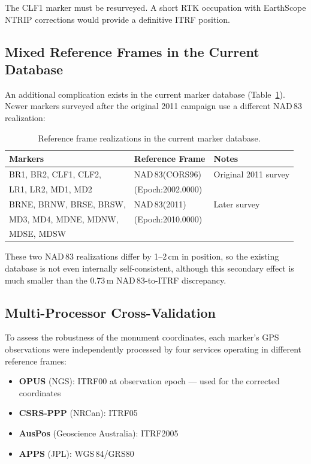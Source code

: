 \documentclass[11pt,letterpaper]{article}
\begin{document}
\noindent The CLF1 marker must be resurveyed. A short RTK occupation with EarthScope NTRIP corrections would provide a definitive ITRF position.

\subsection{Mixed Reference Frames in the Current Database}

An additional complication exists in the current marker database (Table~\ref{tab:mixed_frames}). Newer markers surveyed after the original 2011 campaign use a different NAD\,83 realization:

\begin{table}[H]
\centering
\caption{Reference frame realizations in the current marker database.}
\label{tab:mixed_frames}
\smallskip
\begin{tabular}{@{}lll@{}}
\toprule
{Markers} & {Reference Frame} & {Notes} \\
\midrule
BR1, BR2, CLF1, CLF2, & NAD\,83(CORS96) & Original 2011 survey \\
LR1, LR2, MD1, MD2    & (Epoch:2002.0000) & \\
\addlinespace
BRNE, BRNW, BRSE, BRSW, & NAD\,83(2011) & Later survey \\
MD3, MD4, MDNE, MDNW,   & (Epoch:2010.0000) & \\
MDSE, MDSW               &                   & \\
\bottomrule
\end{tabular}
\end{table}

\noindent These two NAD\,83 realizations differ by 1--2\,cm in position, so the existing database is not even internally self-consistent, although this secondary effect is much smaller than the 0.73\,m NAD\,83-to-ITRF discrepancy.

\subsection{Multi-Processor Cross-Validation}

To assess the robustness of the monument coordinates, each marker's GPS observations were independently processed by four services operating in different reference frames:

\begin{itemize}[nosep]
    \item \textbf{OPUS} (NGS): ITRF00 at observation epoch --- used for the corrected coordinates
    \item \textbf{CSRS-PPP} (NRCan): ITRF05
    \item \textbf{AusPos} (Geoscience Australia): ITRF2005
    \item \textbf{APPS} (JPL): WGS\,84/GRS80
\end{itemize}
\end{document}
